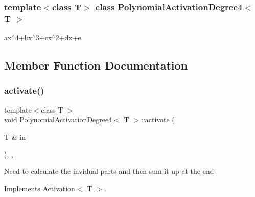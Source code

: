 \subsubsection*{template$<$class T$>$\newline
class Polynomial\+Activation\+Degree4$<$ T $>$}

ax$^\wedge$4+bx$^\wedge$3+cx$^\wedge$2+dx+e 

\subsection{Member Function Documentation}
\mbox{\label{classPolynomialActivationDegree4_a717e653fd47c869f7b7d257215f56548}} 
\subsubsection{\texorpdfstring{activate()}{activate()}}
{\footnotesize\ttfamily template$<$class T $>$ \\
void \hyperlink{classPolynomialActivationDegree4}{Polynomial\+Activation\+Degree4}$<$ T $>$\+::activate (\begin{DoxyParamCaption}\item[{T \&}]{in }\end{DoxyParamCaption})\hspace{0.3cm}{\ttfamily [inline]}, {\ttfamily [override]}, {\ttfamily [virtual]}}

Need to calculate the invidual parts and then sum it up at the end 

Implements \hyperlink{classActivation}{Activation$<$ T $>$}.

\mbox{\label{classPolynomialActivationDegree4_a346ca80a2c23ef036d6a76297f1ce3c1}} 
